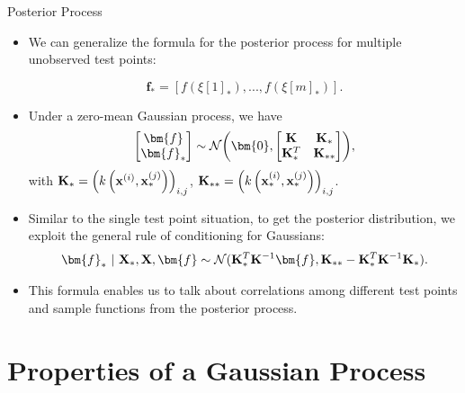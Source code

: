 \begin{vbframe}{Posterior Process}

\begin{itemize}
  \item We can generalize the formula for the posterior process for multiple unobserved test points: 

$$
  \bm{f}_* = \left[f\left(\xi[1]_*\right), ..., f\left(\xi[m]_*\right)\right]. 
$$
  \item Under a zero-mean Gaussian process, we have
  $$
    \begin{bmatrix}
    \bm{f} \\
    \bm{f}_*
    \end{bmatrix} \sim  
    \mathcal{N}\biggl(\bm{0}, \begin{bmatrix} \Kmat & \Kmat_* \\ \Kmat_*^T & \Kmat_{**} \end{bmatrix}\biggr),
  $$
    with $\Kmat_* = \left(k\left(\xi, \xv_*^{(j)}\right)\right)_{i,j}$, $\Kmat_{**} = \left(k\left(\xi[i]_*, \xi[j]_*\right)\right)_{i,j}$.
  
  \framebreak 
  
  \item Similar to the single test point situation, to get the posterior distribution, we exploit the general rule of conditioning for Gaussians:
  \begin{eqnarray*}
    \bm{f}_* ~|~ \Xmat_*, \Xmat, \bm{f} \sim \mathcal{N}(\Kmat_{*}^{T}\Kmat^{-1}\bm{f}, \Kmat_{**} - \Kmat_*^T \Kmat ^{-1}\Kmat_*).
  \end{eqnarray*}  
  \item This formula enables us to talk about correlations among different test points and sample functions from the posterior process. 
\end{itemize}

\end{vbframe}


\section{Properties of a Gaussian Process}

